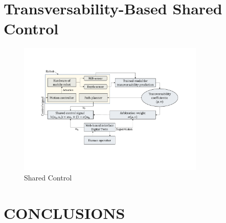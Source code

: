 \documentclass[letterpaper, 10 pt, conference]{ieeeconf}  %
\begin{document}




   


\section{Transversability-Based Shared Control}
\begin{figure}[htbp]
	\centerline{\includegraphics[width=8.9cm]{images/transversability.pdf}}
	\caption{Shared Control}
	\label{fig:sharedcontrol}
\end{figure}
\section{CONCLUSIONS}


\addtolength{\textheight}{-12cm}   %




\end{document}
